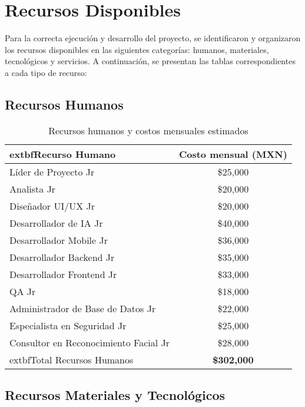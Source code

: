 \section{Recursos Disponibles}


Para la correcta ejecución y desarrollo del proyecto, se identificaron y organizaron los recursos disponibles en las siguientes categorías: humanos, materiales, tecnológicos y servicios. A continuación, se presentan las tablas correspondientes a cada tipo de recurso:

\subsection{Recursos Humanos}

\begin{table}[h!]
\centering
\footnotesize
\setlength{\tabcolsep}{3.5pt}
\renewcommand{\arraystretch}{0.98}
\begin{tabular}{|l|c|}
\hline
	extbf{Recurso Humano} & \textbf{Costo mensual (MXN)} \\
\hline
Líder de Proyecto Jr & \$25,000 \\
Analista Jr & \$20,000 \\
Diseñador UI/UX Jr & \$20,000 \\
Desarrollador de IA Jr & \$40,000 \\
Desarrollador Mobile Jr & \$36,000 \\
Desarrollador Backend Jr & \$35,000 \\
Desarrollador Frontend Jr & \$33,000 \\
QA Jr & \$18,000 \\
Administrador de Base de Datos Jr & \$22,000 \\
Especialista en Seguridad Jr & \$25,000 \\
Consultor en Reconocimiento Facial Jr & \$28,000 \\
\hline
	extbf{Total Recursos Humanos} & \textbf{\$302,000} \\
\hline
\end{tabular}
\caption{Recursos humanos y costos mensuales estimados}
\end{table}

\subsection{Recursos Materiales y Tecnológicos}

